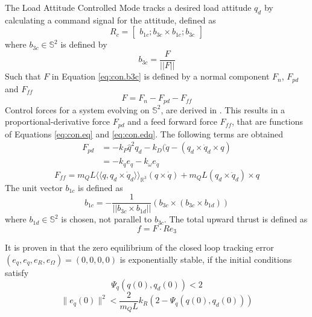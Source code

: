 The Load Attitude Controlled Mode tracks a desired load attitude $ q_d $ by calculating a command signal for the  attitude, defined as
\begin{equation}\label{eq:con.R}
R_c = \begin{bmatrix}
b_{1c}; b_{3c}\times b_{1c};b_{3c}
\end{bmatrix}
\end{equation}
where $ b_{3c} \in \mathbb{S}^2 $ is defined by 
\begin{equation}\label{eq:con.b3c}
b_{3c}=\frac{F}{||F||}
\end{equation}
Such that $ F $ in Equation \ref{eq:con.b3c} is defined by a normal component $ F_n $, $ F_{pd} $ and $ F_{ff}$
\begin{equation}\label{key}
F=F_n-F_{pd}-F_{ff}
\end{equation}
 Control forces for a system evolving on $ \mathbb{S}^2 $, are derived in \cite{Bullo2005}. 
 This results in a proportional-derivative force $ F_{pd} $ and a feed forward force $ F_{ff} $, that are functions of Equations \ref{eq:con.eq} and \ref{eq:con.edq}. The following terms are obtained
\begin{equation}\label{key}
\begin{aligned}
F_{pd}&=-k_P\hat{q}^2q_d-k_D(\dot{q}-(q_d\times\dot{q}_d\times q)\\
&=-k_qe_q-k_\omega e_{\dot{q}}
\end{aligned}
\end{equation}
\begin{equation}\label{key}
F_{ff}=m_QL\langle\langle q,q_d\times\dot{q}_d\rangle\rangle_{\mathbb{R}^3}(q\times \dot{q})+m_QL(q_d\times \ddot{q}_d)\times q
\end{equation}
The unit vector $ b_{1c} $ is defined as
\begin{equation}\label{key}
b_{1c}=-\frac{1}{||b_{3c}\times b_{1d}||}(b_{3c}\times(b_{3c}\times b_{1d}))
\end{equation}
where $ b_{1d}\in \mathbb{S}^2 $ is chosen, not parallel to $ b_{3c} $.
The total upward thrust is defined as
\begin{equation}\label{key}
f=F\cdot Re_3
\end{equation}

It is proven in \cite{Sreenath2013c} that the zero equilibrium of the closed loop tracking error $ (e_q,e_{\dot{q}},e_R,e_\Omega)=(0,0,0,0) $ is exponentially stable, if the initial conditions satisfy
\begin{equation}\label{eq:dom3}
\Psi_q(q(0),q_d(0))<2
\end{equation}
\begin{equation}\label{eq:dom4}
\parallel e_{\dot{q}}(0)\parallel^2<\frac{2}{m_QL}{k_R}(2-\Psi_q(q(0),q_d(0)))
\end{equation}

